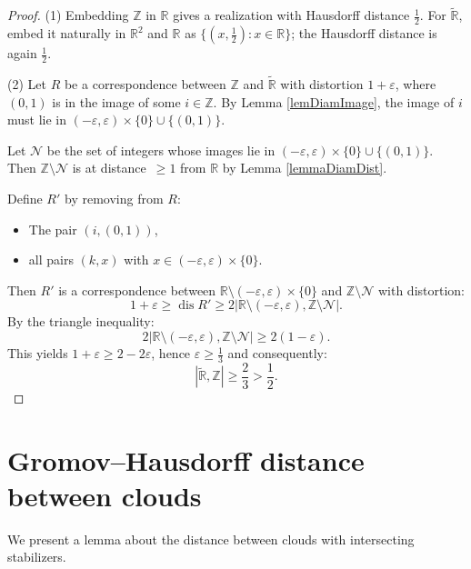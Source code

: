 \begin{proof}
  (1) Embedding $\mathbb{Z}$ in $\mathbb{R}$ gives a realization with
  Hausdorff distance $\frac{1}{2}$. For $\widetilde{\mathbb{R}}$,
  embed it naturally in $\mathbb{R}^2$ and $\mathbb{R}$ as $\{(x,
  \frac{1}{2}) : x \in \mathbb{R}\}$; the Hausdorff distance is again
  $\frac{1}{2}$.

  (2) Let $R$ be a correspondence between $\mathbb{Z}$ and
  $\widetilde{\mathbb{R}}$ with distortion $1 + \varepsilon$, where
  $(0,1)$ is in the image of some $i \in \mathbb{Z}$. By Lemma
  \ref{lemDiamImage}, the image of $i$ must lie in $(-\varepsilon,
  \varepsilon) \times \{0\} \cup \{(0,1)\}$.

  Let $\mathcal{N}$ be the set of integers whose images lie in
  $(-\varepsilon, \varepsilon) \times \{0\} \cup \{(0,1)\}$. Then
  $\mathbb{Z} \setminus \mathcal{N}$ is at \mbox{distance $\geq 1$}
  from $\mathbb{R}$ by Lemma \ref{lemmaDiamDist}.

  Define $R'$ by removing from $R$:
  \begin{itemize}
    \item The pair $(i,(0,1))$,
    \item all pairs $(k,x)$ with $x \in (-\varepsilon, \varepsilon)
      \times \{0\}$.
  \end{itemize}

  Then $R'$ is a correspondence between
  $\mathbb{R}\setminus(-\varepsilon, \varepsilon) \times \{0\}$ and
  $\mathbb{Z} \setminus \mathcal{N}$ with distortion:
  $$
  1+\varepsilon \geq \operatorname{dis} R' \geq
  2\big|\mathbb{R}\setminus(-\varepsilon, \varepsilon), \mathbb{Z}
  \setminus \mathcal{N}\big|.
  $$
  By the triangle inequality:
  $$
  2\big|\mathbb{R}\setminus(-\varepsilon, \varepsilon), \mathbb{Z}
  \setminus \mathcal{N}\big| \geq 2(1 - \varepsilon).
  $$
  This yields $1+\varepsilon \geq 2-2\varepsilon$, hence $\varepsilon
  \geq \frac{1}{3}$ and consequently:
  $$
  |\widetilde{\mathbb{R}}, \mathbb{Z}| \geq \frac{2}{3} > \frac{1}{2}.
  $$
\end{proof}

\section{Gromov--Hausdorff distance between clouds}

We present a lemma about the distance between clouds with
intersecting stabilizers.

